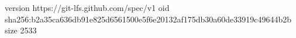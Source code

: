 version https://git-lfs.github.com/spec/v1
oid sha256:b2a35ca636db91e825d6561500e5f6e20132af175db30a60de33919c49644b2b
size 2533
